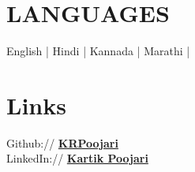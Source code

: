 \documentclass[]{resume}
\begin{document}
\begin{minipage}[t]{0.33\textwidth}
\section{LANGUAGES}
English | 
Hindi | 
Kannada |  
Marathi | 

\bigskip
\bigskip


\section{Links}
Github:// \href{https://github.com/KRPoojari}{\bf KRPoojari} \\
LinkedIn://  \href{https://www.linkedin.com/in/kartik-poojari-74250b201/}{\bf Kartik Poojari} \\

\sectionsep

\end{minipage}
\end{document}

